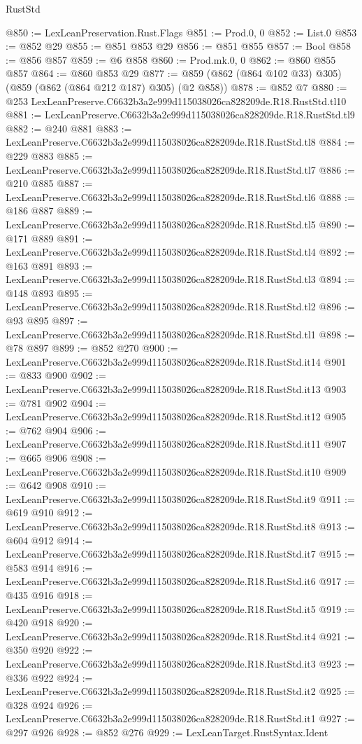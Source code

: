 \begin{lexlean}{RustStd}
\begin{coremodule}
@850 := LexLeanPreservation.Rust.Flags
@851 := Prod.{0, 0}
@852 := List.{0}
@853 := @852 @29
@855 := @851 @853 @29
@856 := @851 @855
@857 := Bool
@858 := @856 @857
@859 := @6 @858
@860 := Prod.mk.{0, 0}
@862 := @860 @855 @857
@864 := @860 @853 @29
@877 := @859 (@862 (@864 @102 @33) @305) (@859 (@862 (@864 @212 @187) @305) (@2 @858))
@878 := @852 @7
@880 := @253 LexLeanPreserve.C6632b3a2e999d115038026ca828209de.R18.RustStd.tl10
@881 := LexLeanPreserve.C6632b3a2e999d115038026ca828209de.R18.RustStd.tl9
@882 := @240 @881
@883 := LexLeanPreserve.C6632b3a2e999d115038026ca828209de.R18.RustStd.tl8
@884 := @229 @883
@885 := LexLeanPreserve.C6632b3a2e999d115038026ca828209de.R18.RustStd.tl7
@886 := @210 @885
@887 := LexLeanPreserve.C6632b3a2e999d115038026ca828209de.R18.RustStd.tl6
@888 := @186 @887
@889 := LexLeanPreserve.C6632b3a2e999d115038026ca828209de.R18.RustStd.tl5
@890 := @171 @889
@891 := LexLeanPreserve.C6632b3a2e999d115038026ca828209de.R18.RustStd.tl4
@892 := @163 @891
@893 := LexLeanPreserve.C6632b3a2e999d115038026ca828209de.R18.RustStd.tl3
@894 := @148 @893
@895 := LexLeanPreserve.C6632b3a2e999d115038026ca828209de.R18.RustStd.tl2
@896 := @93 @895
@897 := LexLeanPreserve.C6632b3a2e999d115038026ca828209de.R18.RustStd.tl1
@898 := @78 @897
@899 := @852 @270
@900 := LexLeanPreserve.C6632b3a2e999d115038026ca828209de.R18.RustStd.it14
@901 := @833 @900
@902 := LexLeanPreserve.C6632b3a2e999d115038026ca828209de.R18.RustStd.it13
@903 := @781 @902
@904 := LexLeanPreserve.C6632b3a2e999d115038026ca828209de.R18.RustStd.it12
@905 := @762 @904
@906 := LexLeanPreserve.C6632b3a2e999d115038026ca828209de.R18.RustStd.it11
@907 := @665 @906
@908 := LexLeanPreserve.C6632b3a2e999d115038026ca828209de.R18.RustStd.it10
@909 := @642 @908
@910 := LexLeanPreserve.C6632b3a2e999d115038026ca828209de.R18.RustStd.it9
@911 := @619 @910
@912 := LexLeanPreserve.C6632b3a2e999d115038026ca828209de.R18.RustStd.it8
@913 := @604 @912
@914 := LexLeanPreserve.C6632b3a2e999d115038026ca828209de.R18.RustStd.it7
@915 := @583 @914
@916 := LexLeanPreserve.C6632b3a2e999d115038026ca828209de.R18.RustStd.it6
@917 := @435 @916
@918 := LexLeanPreserve.C6632b3a2e999d115038026ca828209de.R18.RustStd.it5
@919 := @420 @918
@920 := LexLeanPreserve.C6632b3a2e999d115038026ca828209de.R18.RustStd.it4
@921 := @350 @920
@922 := LexLeanPreserve.C6632b3a2e999d115038026ca828209de.R18.RustStd.it3
@923 := @336 @922
@924 := LexLeanPreserve.C6632b3a2e999d115038026ca828209de.R18.RustStd.it2
@925 := @328 @924
@926 := LexLeanPreserve.C6632b3a2e999d115038026ca828209de.R18.RustStd.it1
@927 := @297 @926
@928 := @852 @276
@929 := LexLeanTarget.RustSyntax.Ident

\end{coremodule}
\end{lexlean}
